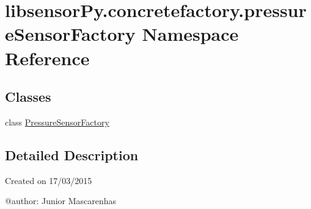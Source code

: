 \hypertarget{namespacelibsensorPy_1_1concretefactory_1_1pressureSensorFactory}{}\section{libsensor\+Py.\+concretefactory.\+pressure\+Sensor\+Factory Namespace Reference}
\label{namespacelibsensorPy_1_1concretefactory_1_1pressureSensorFactory}
\subsection*{Classes}
\begin{DoxyCompactItemize}
\item 
class \hyperlink{classlibsensorPy_1_1concretefactory_1_1pressureSensorFactory_1_1PressureSensorFactory}{Pressure\+Sensor\+Factory}
\end{DoxyCompactItemize}


\subsection{Detailed Description}
\begin{DoxyVerb}Created on 17/03/2015

@author: Junior Mascarenhas
\end{DoxyVerb}
 